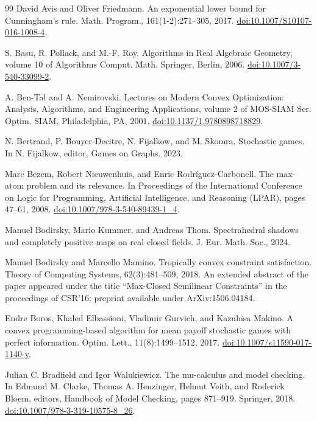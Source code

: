 \documentclass[10pt,a4paper]{article}
\theoremstyle{definition}
\begin{document}
\begin{thebibliography}{99}
 David Avis and Oliver Friedmann. An exponential lower bound for Cunningham’s rule. Math. Program., 161(1-2):271–305, 2017. \href{https://doi.org/10.1007/S10107-016-1008-4}{doi:10.1007/S10107-016-1008-4}.

 S. Basu, R. Pollack, and M.-F. Roy. Algorithms in Real Algebraic Geometry, volume 10 of Algorithms Comput. Math. Springer, Berlin, 2006. \href{https://doi.org/10.1007/3-540-33099-2}{doi:10.1007/3-540-33099-2}.

 A. Ben-Tal and A. Nemirovski. Lectures on Modern Convex Optimization: Analysis, Algorithms, and Engineering Applications, volume 2 of MOS-SIAM Ser. Optim. SIAM, Philadelphia, PA, 2001. \href{https://doi.org/10.1137/1.9780898718829}{doi:10.1137/1.9780898718829}.

 N. Bertrand, P. Bouyer-Decitre, N. Fijalkow, and M. Skomra. Stochastic games. In N. Fijalkow, editor, Games on Graphs. 2023.

 Marc Bezem, Robert Nieuwenhuis, and Enric Rodríguez-Carbonell. The max-atom problem and its relevance. In Proceedings of the International Conference on Logic for Programming, Artificial Intelligence, and Reasoning (LPAR), pages 47–61, 2008. \href{https://doi.org/10.1007/978-3-540-89439-1_4}{doi:10.1007/978-3-540-89439-1\_4}.

 Manuel Bodirsky, Mario Kummer, and Andreas Thom. Spectrahedral shadows and completely positive maps on real closed fields. J. Eur. Math. Soc., 2024.

 Manuel Bodirsky and Marcello Mamino. Tropically convex constraint satisfaction. Theory of Computing Systems, 62(3):481–509, 2018. An extended abstract of the paper appeared under the title “Max-Closed Semilinear Constraints” in the proceedings of CSR’16; preprint available under ArXiv:1506.04184.

 Endre Boros, Khaled Elbassioni, Vladimir Gurvich, and Kazuhisa Makino. A convex programming-based algorithm for mean payoff stochastic games with perfect information. Optim. Lett., 11(8):1499–1512, 2017. \href{https://doi.org/10.1007/s11590-017-1140-y}{doi:10.1007/s11590-017-1140-y}.

 Julian C. Bradfield and Igor Walukiewicz. The mu-calculus and model checking. In Edmund M. Clarke, Thomas A. Henzinger, Helmut Veith, and Roderick Bloem, editors, Handbook of Model Checking, pages 871–919. Springer, 2018. \href{https://doi.org/10.1007/978-3-319-10575-8_26}{doi:10.1007/978-3-319-10575-8\_26}.


\end{thebibliography}
\end{document}
